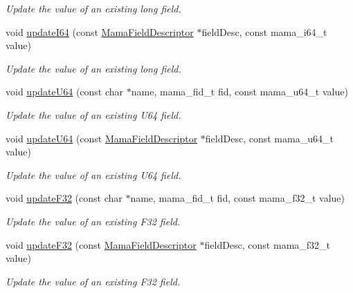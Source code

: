 \begin{DoxyCompactItemize}
\begin{DoxyCompactList}\small\item\em Update the value of an existing long field. \item\end{DoxyCompactList}\item 
void \hyperlink{classWombat_1_1MamaMsg_a48620236cd07bcec1722e5ee268dd012}{updateI64} (const \hyperlink{classWombat_1_1MamaFieldDescriptor}{MamaFieldDescriptor} $\ast$fieldDesc, const mama\_\-i64\_\-t value)
\begin{DoxyCompactList}\small\item\em Update the value of an existing long field. \item\end{DoxyCompactList}\item 
void \hyperlink{classWombat_1_1MamaMsg_a037e5ebbe88af7be3ef09c92d4d3626f}{updateU64} (const char $\ast$name, mama\_\-fid\_\-t fid, const mama\_\-u64\_\-t value)
\begin{DoxyCompactList}\small\item\em Update the value of an existing U64 field. \item\end{DoxyCompactList}\item 
void \hyperlink{classWombat_1_1MamaMsg_a44733b4753b2f76e3f97f780ce13c8c0}{updateU64} (const \hyperlink{classWombat_1_1MamaFieldDescriptor}{MamaFieldDescriptor} $\ast$fieldDesc, const mama\_\-u64\_\-t value)
\begin{DoxyCompactList}\small\item\em Update the value of an existing U64 field. \item\end{DoxyCompactList}\item 
void \hyperlink{classWombat_1_1MamaMsg_a7882d6c3c0cd29d2c266f7a9e99725fb}{updateF32} (const char $\ast$name, mama\_\-fid\_\-t fid, const mama\_\-f32\_\-t value)
\begin{DoxyCompactList}\small\item\em Update the value of an existing F32 field. \item\end{DoxyCompactList}\item 
void \hyperlink{classWombat_1_1MamaMsg_a609b8da1c0708e8c7e1b3097856c71a4}{updateF32} (const \hyperlink{classWombat_1_1MamaFieldDescriptor}{MamaFieldDescriptor} $\ast$fieldDesc, const mama\_\-f32\_\-t value)
\begin{DoxyCompactList}\small\item\em Update the value of an existing F32 field. \item\end{DoxyCompactList}\item 

\end{DoxyCompactItemize}
